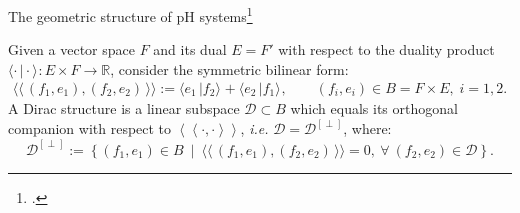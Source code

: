 \documentclass[aspectratio=169]{beamer}
\newcommand{\dualpr}[3][]{\ensuremath{\langle #2 \, \vert #3 \rangle_{#1}}}
\newcommand{\bilprod}[2]{\langle \langle \, #1, #2 \, \rangle \rangle}
\begin{document}
	
	\begin{frame}{The geometric structure of pH systems\footcite{courant1990}}
		\begin{definition}
			Given a vector space ${F}$ and its dual ${E}=F'$ with respect to the duality product $\dualpr{\cdot}{\cdot} : {E} \times {F} \rightarrow \mathbb{R}$, consider the symmetric bilinear form:
			$$
			\bilprod{({f}_1, {e}_1)}{({f}_2, {e}_2)} := {\dualpr{{e}_1}{{f}_2}} + {\dualpr{{e}_2}{{f}_1}}, \qquad ({f}_i, {e}_i) \in {B} = {F} \times {E}, \; i = 1, 2.
			$$
			A Dirac structure is a linear subspace $\mathcal{D} \subset {B}$ which equals its orthogonal companion with respect to $\left\langle \left\langle \cdot, \cdot \right\rangle \right\rangle$, {\it i.e.} $\mathcal{D} =\mathcal{D}^{[\perp]}$, where:
			$$
			\mathcal{D}^{[\perp]} := \left\{ ({f}_1, {e}_1) \in {B} ~ \mid ~ \bilprod{({f}_1, {e}_1)}{({f}_2, {e}_2)} = 0, ~ \forall ~ ({f}_2, {e}_2) \in \mathcal{D} \right\}.
			$$
		\end{definition}
		
		
	\end{frame}
	
	
	
\end{document}
